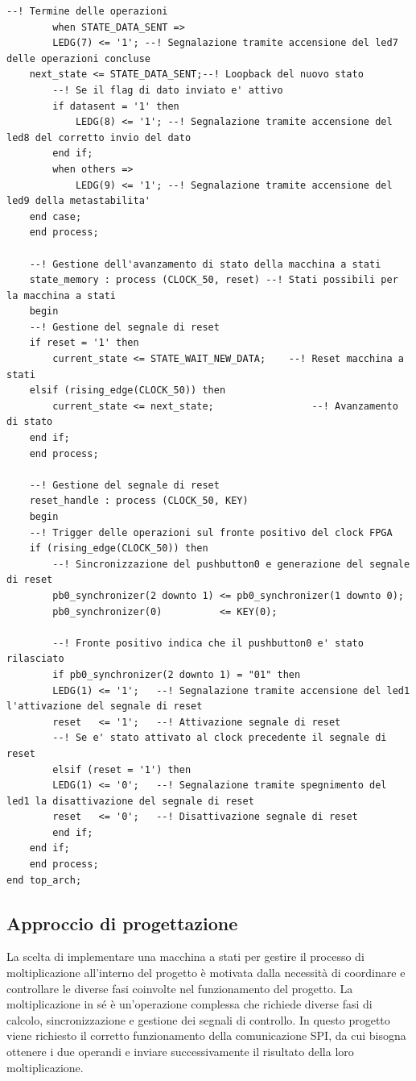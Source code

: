\documentclass[titlepage]{report}
\begin{document}
\begin{lstlisting}[caption={Top level implementato per la nostra architettura}, label={lst:mul16_process}]
		--! Termine delle operazioni
		when STATE_DATA_SENT =>
		LEDG(7) <= '1'; --! Segnalazione tramite accensione del led7 delle operazioni concluse
	next_state <= STATE_DATA_SENT;--! Loopback del nuovo stato
		--! Se il flag di dato inviato e' attivo
		if datasent = '1' then
			LEDG(8) <= '1'; --! Segnalazione tramite accensione del led8 del corretto invio del dato
		end if;
		when others =>
			LEDG(9) <= '1'; --! Segnalazione tramite accensione del led9 della metastabilita'
	end case;
	end process;

	--! Gestione dell'avanzamento di stato della macchina a stati
	state_memory : process (CLOCK_50, reset) --! Stati possibili per la macchina a stati
	begin
	--! Gestione del segnale di reset
	if reset = '1' then
		current_state <= STATE_WAIT_NEW_DATA;    --! Reset macchina a stati
	elsif (rising_edge(CLOCK_50)) then
		current_state <= next_state;			     --! Avanzamento di stato
	end if;
	end process;
	
	--! Gestione del segnale di reset
	reset_handle : process (CLOCK_50, KEY)
	begin
	--! Trigger delle operazioni sul fronte positivo del clock FPGA
	if (rising_edge(CLOCK_50)) then
		--! Sincronizzazione del pushbutton0 e generazione del segnale di reset
		pb0_synchronizer(2 downto 1) <= pb0_synchronizer(1 downto 0);
		pb0_synchronizer(0)          <= KEY(0);

		--! Fronte positivo indica che il pushbutton0 e' stato rilasciato
		if pb0_synchronizer(2 downto 1) = "01" then
		LEDG(1) <= '1';   --! Segnalazione tramite accensione del led1 l'attivazione del segnale di reset
		reset   <= '1';   --! Attivazione segnale di reset
		--! Se e' stato attivato al clock precedente il segnale di reset
		elsif (reset = '1') then
		LEDG(1) <= '0';   --! Segnalazione tramite spegnimento del led1 la disattivazione del segnale di reset
		reset   <= '0';   --! Disattivazione segnale di reset
		end if;
	end if;
	end process;
end top_arch;
		\end{lstlisting}
		\subsection*{Approccio di progettazione}
		\label{subsec:approccio_progettazione}
			La scelta di implementare una macchina a stati per gestire il processo di moltiplicazione all'interno del progetto è motivata dalla necessità di coordinare e controllare le diverse fasi coinvolte nel funzionamento del progetto. La moltiplicazione in sé è un'operazione complessa che richiede diverse fasi di calcolo, sincronizzazione e gestione dei segnali di controllo. In questo progetto viene richiesto il corretto funzionamento della comunicazione SPI, da cui bisogna ottenere i due operandi e inviare successivamente il risultato della loro moltiplicazione.
\end{document}
